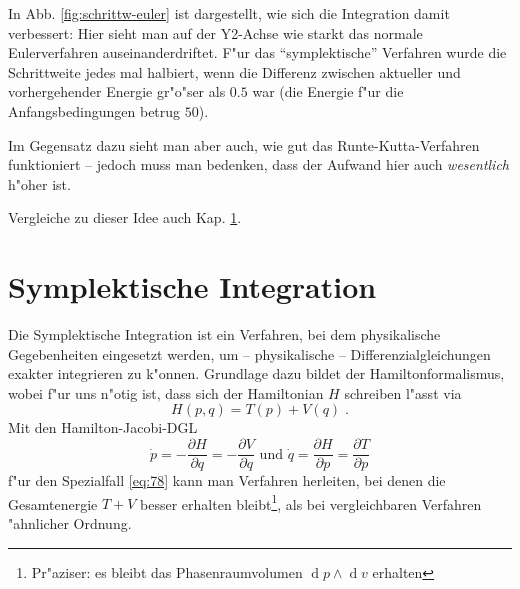 \documentclass[a4paper]{book}
\newcommand{\diff}{\ensuremath{\operatorname d}}
\begin{document}
In Abb. 
\ref{fig:schrittw-euler}
ist dargestellt, wie sich die Integration damit verbessert: Hier sieht
man auf der Y2-Achse wie starkt das normale Eulerverfahren
auseinanderdriftet. F"ur das "`symplektische"' Verfahren wurde die
Schrittweite jedes mal halbiert, wenn die Differenz zwischen aktueller
und vorhergehender Energie gr"o"ser als $0.5$ war (die Energie f"ur
die Anfangsbedingungen betrug $50$).

Im Gegensatz dazu sieht man aber auch, wie gut das
Runte-Kutta-Verfahren funktioniert -- jedoch muss man bedenken, dass
der Aufwand hier auch \emph{wesentlich} h"oher ist.

Vergleiche zu dieser Idee auch Kap. \ref{sec:symplektische_integration}.






\section{Symplektische Integration}
\label{sec:symplektische_integration}

Die Symplektische Integration ist ein Verfahren, bei dem physikalische
Gegebenheiten eingesetzt werden, um -- physikalische --
Differenzialgleichungen exakter integrieren zu k"onnen. Grundlage dazu
bildet der Hamiltonformalismus, wobei f"ur uns n"otig ist, dass sich
der Hamiltonian $H$ schreiben l"asst via
\begin{equation}
  \label{eq:78}
  H(p,q) = T(p) + V(q) \;.
\end{equation}
Mit den Hamilton-Jacobi-DGL
\begin{equation}
\label{eq:79}
  \dot p = - \frac{\partial H}{\partial q} = - \frac{\partial
    V}{\partial q} \text{ und } \dot q = \frac{\partial H}{\partial p}
  = \frac{\partial T}{\partial p}
\end{equation}
f"ur den Spezialfall \eqref{eq:78} kann man Verfahren herleiten, bei
denen die Gesamtenergie $T+V$ besser erhalten
bleibt\footnote{Pr"aziser: es bleibt das Phasenraumvolumen $\diff p
  \wedge \diff v$ erhalten}, als bei vergleichbaren Verfahren
"ahnlicher Ordnung. 
\end{document}

